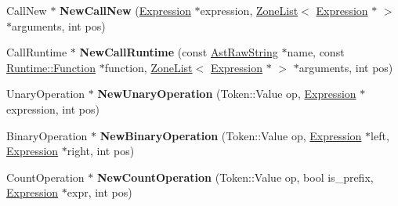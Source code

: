 \begin{DoxyCompactItemize}
\item 
\hypertarget{classv8_1_1internal_1_1_b_a_s_e___e_m_b_e_d_d_e_d_a0fea6560068488abb49575169aa443d8}{}Call\+New $\ast$ {\bfseries New\+Call\+New} (\hyperlink{classv8_1_1internal_1_1_expression}{Expression} $\ast$expression, \hyperlink{classv8_1_1internal_1_1_zone_list}{Zone\+List}$<$ \hyperlink{classv8_1_1internal_1_1_expression}{Expression} $\ast$ $>$ $\ast$arguments, int pos)\label{classv8_1_1internal_1_1_b_a_s_e___e_m_b_e_d_d_e_d_a0fea6560068488abb49575169aa443d8}

\item 
\hypertarget{classv8_1_1internal_1_1_b_a_s_e___e_m_b_e_d_d_e_d_af0773d1ebe64cc3542f2dc4f26b3c871}{}Call\+Runtime $\ast$ {\bfseries New\+Call\+Runtime} (const \hyperlink{classv8_1_1internal_1_1_ast_raw_string}{Ast\+Raw\+String} $\ast$name, const \hyperlink{structv8_1_1internal_1_1_runtime_1_1_function}{Runtime\+::\+Function} $\ast$function, \hyperlink{classv8_1_1internal_1_1_zone_list}{Zone\+List}$<$ \hyperlink{classv8_1_1internal_1_1_expression}{Expression} $\ast$ $>$ $\ast$arguments, int pos)\label{classv8_1_1internal_1_1_b_a_s_e___e_m_b_e_d_d_e_d_af0773d1ebe64cc3542f2dc4f26b3c871}

\item 
\hypertarget{classv8_1_1internal_1_1_b_a_s_e___e_m_b_e_d_d_e_d_a0e654d127115b89ded629b80ec4d37b5}{}Unary\+Operation $\ast$ {\bfseries New\+Unary\+Operation} (Token\+::\+Value op, \hyperlink{classv8_1_1internal_1_1_expression}{Expression} $\ast$expression, int pos)\label{classv8_1_1internal_1_1_b_a_s_e___e_m_b_e_d_d_e_d_a0e654d127115b89ded629b80ec4d37b5}

\item 
\hypertarget{classv8_1_1internal_1_1_b_a_s_e___e_m_b_e_d_d_e_d_afbdf0f3d689c727283644a15a9d7a5d7}{}Binary\+Operation $\ast$ {\bfseries New\+Binary\+Operation} (Token\+::\+Value op, \hyperlink{classv8_1_1internal_1_1_expression}{Expression} $\ast$left, \hyperlink{classv8_1_1internal_1_1_expression}{Expression} $\ast$right, int pos)\label{classv8_1_1internal_1_1_b_a_s_e___e_m_b_e_d_d_e_d_afbdf0f3d689c727283644a15a9d7a5d7}

\item 
\hypertarget{classv8_1_1internal_1_1_b_a_s_e___e_m_b_e_d_d_e_d_a0778517a1227915536c5e7e16153a2f9}{}Count\+Operation $\ast$ {\bfseries New\+Count\+Operation} (Token\+::\+Value op, bool is\+\_\+prefix, \hyperlink{classv8_1_1internal_1_1_expression}{Expression} $\ast$expr, int pos)\label{classv8_1_1internal_1_1_b_a_s_e___e_m_b_e_d_d_e_d_a0778517a1227915536c5e7e16153a2f9}


\end{DoxyCompactItemize}
